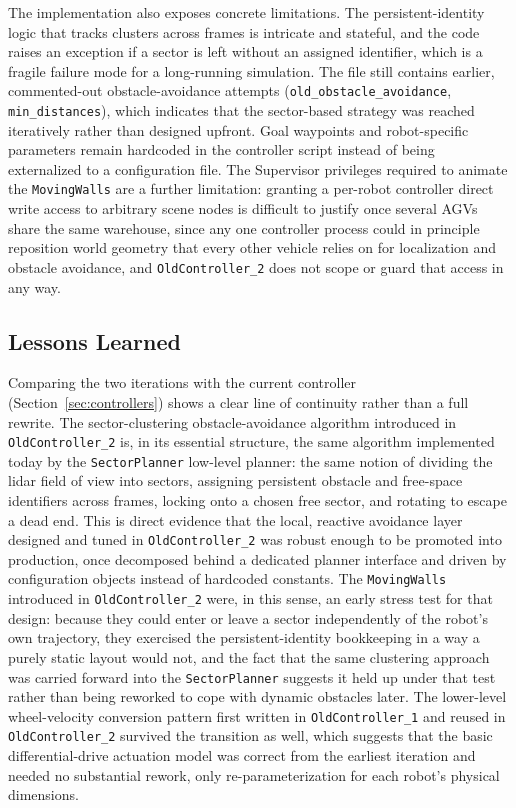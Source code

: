 The implementation also exposes concrete limitations. The persistent-identity logic that tracks clusters across frames is intricate and stateful, and the code raises an exception if a sector is left without an assigned identifier, which is a fragile failure mode for a long-running simulation. The file still contains earlier, commented-out obstacle-avoidance attempts (\texttt{old\_obstacle\_avoidance}, \texttt{min\_distances}), which indicates that the sector-based strategy was reached iteratively rather than designed upfront. Goal waypoints and robot-specific parameters remain hardcoded in the controller script instead of being externalized to a configuration file. The Supervisor privileges required to animate the \texttt{MovingWalls} are a further limitation: granting a per-robot controller direct write access to arbitrary scene nodes is difficult to justify once several AGVs share the same warehouse, since any one controller process could in principle reposition world geometry that every other vehicle relies on for localization and obstacle avoidance, and \texttt{OldController\_2} does not scope or guard that access in any way.

\subsection{Lessons Learned}
\label{subsec:old-controller-lessons}

Comparing the two iterations with the current controller (Section~\ref{sec:controllers}) shows a clear line of continuity rather than a full rewrite. The sector-clustering obstacle-avoidance algorithm introduced in \texttt{OldController\_2} is, in its essential structure, the same algorithm implemented today by the \texttt{SectorPlanner} low-level planner: the same notion of dividing the lidar field of view into sectors, assigning persistent obstacle and free-space identifiers across frames, locking onto a chosen free sector, and rotating to escape a dead end. This is direct evidence that the local, reactive avoidance layer designed and tuned in \texttt{OldController\_2} was robust enough to be promoted into production, once decomposed behind a dedicated planner interface and driven by configuration objects instead of hardcoded constants. The \texttt{MovingWalls} introduced in \texttt{OldController\_2} were, in this sense, an early stress test for that design: because they could enter or leave a sector independently of the robot's own trajectory, they exercised the persistent-identity bookkeeping in a way a purely static layout would not, and the fact that the same clustering approach was carried forward into the \texttt{SectorPlanner} suggests it held up under that test rather than being reworked to cope with dynamic obstacles later. The lower-level wheel-velocity conversion pattern first written in \texttt{OldController\_1} and reused in \texttt{OldController\_2} survived the transition as well, which suggests that the basic differential-drive actuation model was correct from the earliest iteration and needed no substantial rework, only re-parameterization for each robot's physical dimensions.

